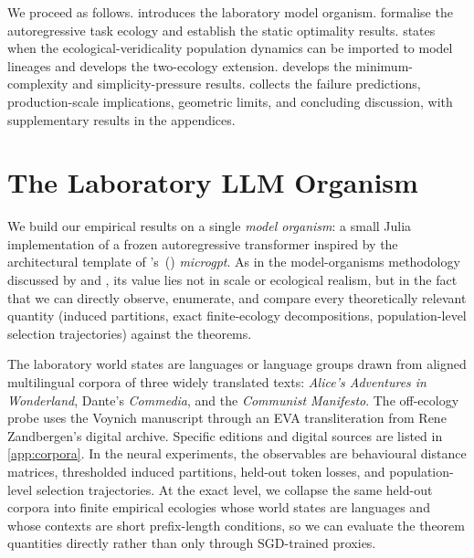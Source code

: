 \documentclass[twoside,11pt]{article}
\begin{document}
We proceed as follows.  introduces the laboratory model organism.  formalise the autoregressive task ecology and establish the static optimality results.  states when the ecological-veridicality population dynamics can be imported to model lineages and develops the two-ecology extension.  develops the minimum-complexity and simplicity-pressure results.  collects the failure predictions, production-scale implications, geometric limits, and concluding discussion, with supplementary results in the appendices.

\section{The Laboratory LLM Organism}\label{sec:lab}

We build our empirical results on a single \emph{model organism}: a small Julia implementation of a frozen autoregressive transformer inspired by the architectural template of \citeauthor{karpathy_2026}'s~(\citeyear{karpathy_2026}) \emph{microgpt}. As in the model-organisms methodology discussed by \citet{hubinger_etal_2024} and \citet{paez_2024}, its value lies not in scale or ecological realism, but in the fact that we can directly observe, enumerate, and compare every theoretically relevant quantity (induced partitions, exact finite-ecology decompositions, population-level selection trajectories) against the theorems.

The laboratory world states are languages or language groups drawn from aligned multilingual corpora of three widely translated texts: \emph{Alice's Adventures in Wonderland}, Dante's \emph{Commedia}, and the \emph{Communist Manifesto}. The off-ecology probe uses the Voynich manuscript through an EVA transliteration from Rene Zandbergen's digital archive. Specific editions and digital sources are listed in \cref{app:corpora}. In the neural experiments, the observables are behavioural distance matrices, thresholded induced partitions, held-out token losses, and population-level selection trajectories. At the exact level, we collapse the same held-out corpora into finite empirical ecologies whose world states are languages and whose contexts are short prefix-length conditions, so we can evaluate the theorem quantities directly rather than only through SGD-trained proxies.
\end{document}
